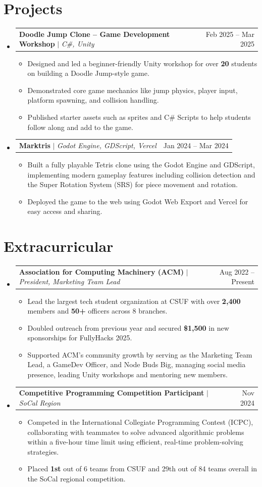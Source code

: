 \documentclass[letterpaper,11pt]{article}
\makeatletter
\newcommand{\resumeItem}[1]{
  \item\small{
    {#1 \vspace{-2pt}}
  }
}
\newcommand{\resumeProjectHeading}[2]{
    \item
    \begin{tabular*}{0.97\textwidth}{l@{\extracolsep{\fill}}r}
      \small#1 & #2 \\
    \end{tabular*}\vspace{-7pt}
}
\newcommand{\resumeSubHeadingListStart}{\begin{itemize}[leftmargin=0.15in, label={}]}
\newcommand{\resumeSubHeadingListEnd}{\end{itemize}}
\newcommand{\resumeItemListStart}{\begin{itemize}}
\newcommand{\resumeItemListEnd}{\end{itemize}\vspace{-5pt}}
\makeatother
\begin{document}
\section{Projects}
    \resumeSubHeadingListStart
      \resumeProjectHeading
          {\textbf{Doodle Jump Clone – Game Development Workshop} $|$ \emph{C\#, Unity}}{Feb 2025 -- Mar 2025}
          \resumeItemListStart
            \resumeItem{Designed and led a beginner-friendly Unity workshop for over \textbf{20} students on building a Doodle Jump-style game.}
            \resumeItem{Demonstrated core game mechanics like jump physics, player input, platform spawning, and collision handling.}
            \resumeItem{Published starter assets such as sprites and C\# Scripts to help students follow along and add to the game.}
          \resumeItemListEnd
      \resumeProjectHeading
          {\textbf{Marktris} $|$ \emph{Godot Engine, GDScript, Vercel}}{Jan 2024 -- Mar 2024}
          \resumeItemListStart
            \resumeItem{Built a fully playable Tetris clone using the Godot Engine and GDScript, implementing modern gameplay features including collision detection and the Super Rotation System (SRS) for piece movement and rotation.}
            \resumeItem{Deployed the game to the web using Godot Web Export and Vercel for easy access and sharing.}
          \resumeItemListEnd
    \resumeSubHeadingListEnd

\section{Extracurricular}

    \resumeSubHeadingListStart
    
      \resumeProjectHeading
          {\textbf{Association for Computing Machinery (ACM)} $|$ \emph{President, Marketing Team Lead}}{Aug 2022 -- Present}
          \resumeItemListStart
            \resumeItem{Lead the largest tech student organization at CSUF with over \textbf{2,400} members and \textbf{50+} officers across 8 branches.}
            \resumeItem{Doubled outreach from previous year and secured \textbf{\$1,500} in new sponsorships for FullyHacks 2025.}
            \resumeItem{Supported ACM’s community growth by serving as the Marketing Team Lead, a GameDev Officer, and Node Buds Big, managing social media presence, leading Unity workshops and mentoring new members.}
          \resumeItemListEnd

      \resumeProjectHeading
          {\textbf{Competitive Programming Competition Participant} $|$ \emph{SoCal Region}}{Nov 2024}
          \resumeItemListStart
            \resumeItem{Competed in the International Collegiate Programming Contest (ICPC), collaborating with teammates to solve advanced algorithmic problems within a five-hour time limit using efficient, real-time problem-solving strategies.}
            \resumeItem{Placed \textbf{1st} out of 6 teams from CSUF and 29th out of 84 teams overall in the SoCal regional competition.}
          \resumeItemListEnd
          
    \resumeSubHeadingListEnd


\end{document}

